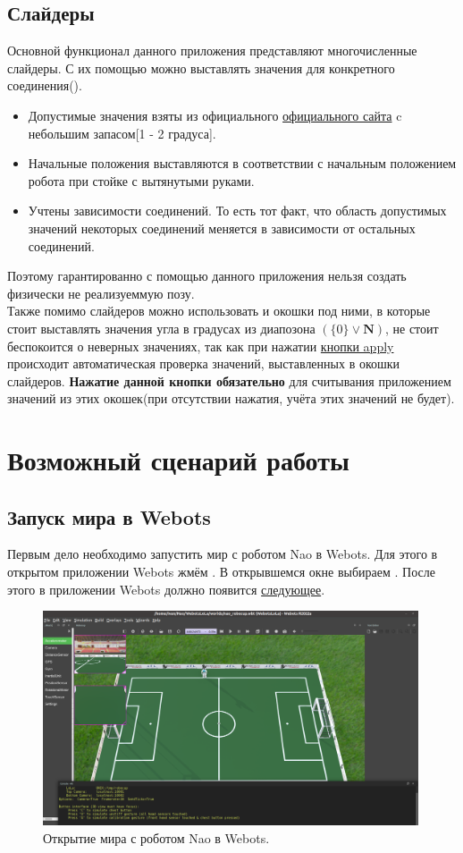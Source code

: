 \documentclass[12pt,a4paper]{article}
\begin{document}
\subsection{Слайдеры}
\label{sliders}
Основной функционал данного приложения представляют многочисленные слайдеры. С их помощью можно выставлять значения для конкретного соединения().
\begin{itemize}
    \item Допустимые значения взяты из официального \href{http://doc.aldebaran.com/2-8/family/nao_technical/joints_naov6.html}{официального сайта} c небольшим запасом[1 - 2 градуса].
    \item Начальные положения выставляются в соответствии с начальным положением робота при стойке с вытянутыми руками.
    \item Учтены зависимости соединений. То есть тот факт, что область допустимых значений некоторых соединений меняется в зависимости от остальных соединений.
    \end{itemize}
Поэтому гарантированно с помощью данного приложения нельзя создать физически не реализуеммую позу.\\
Также помимо слайдеров можно использовать и окошки под ними, в которые стоит выставлять значения угла в градусах из диапозона $(\{0\} \vee \mathbf{N})$, не стоит беспокоится о неверных значениях, так как при нажатии \hyperref[apply]{кнопки apply} происходит автоматическая проверка значений, выставленных в окошки слайдеров. \textbf{Нажатие данной кнопки обязательно} для считывания приложением значений из этих окошек(при отсутствии нажатия, учёта этих значений не будет).
\newpage
\section{Возможный сценарий работы}
\subsection{Запуск мира в Webots}
Первым дело необходимо запустить мир с роботом Nao в Webots. Для этого в открытом приложении Webots жмём . В открывшемся окне выбираем . После этого в приложении Webots должно появится \hyperref[fig:world]{следующее}.
\begin{figure}[h!]
    \centering
    \includegraphics[width = 0.99\textwidth]{./images/webotsWorldOpen.png}
    \caption{Открытие мира с роботом Nao в Webots.}
    \label{fig:world}
\end{figure}
\newpage
\end{document}
